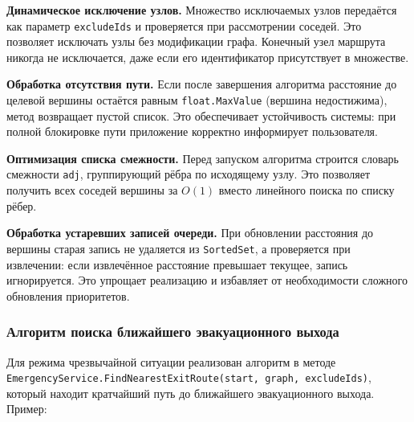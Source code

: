 \textbf{Динамическое исключение узлов.} Множество исключаемых узлов передаётся как параметр \texttt{excludeIds} и проверяется при рассмотрении соседей. Это позволяет исключать узлы без модификации графа. Конечный узел маршрута никогда не исключается, даже если его идентификатор присутствует в множестве.

\textbf{Обработка отсутствия пути.} Если после завершения алгоритма расстояние до целевой вершины остаётся равным \texttt{float.MaxValue} (вершина недостижима), метод возвращает пустой список. Это обеспечивает устойчивость системы: при полной блокировке пути приложение корректно информирует пользователя.

\textbf{Оптимизация списка смежности.} Перед запуском алгоритма строится словарь смежности \texttt{adj}, группирующий рёбра по исходящему узлу. Это позволяет получить всех соседей вершины за $O(1)$ вместо линейного поиска по списку рёбер.

\textbf{Обработка устаревших записей очереди.} При обновлении расстояния до вершины старая запись не удаляется из \texttt{SortedSet}, а проверяется при извлечении: если извлечённое расстояние превышает текущее, запись игнорируется. Это упрощает реализацию и избавляет от необходимости сложного обновления приоритетов.

\subsubsection{Алгоритм поиска ближайшего эвакуационного выхода}

Для режима чрезвычайной ситуации реализован алгоритм в методе \texttt{EmergencyService.FindNearestExitRoute(start, graph, excludeIds)}, который находит кратчайший путь до ближайшего эвакуационного выхода. Пример: 

